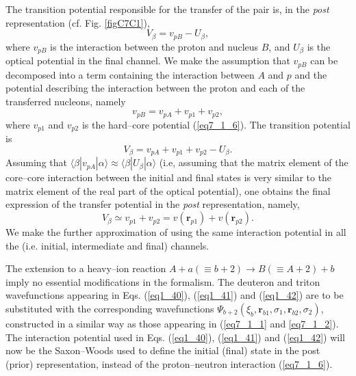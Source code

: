 The transition potential responsible for the transfer of the pair is, in the \emph{post} representation (cf. Fig. \ref{figC7C1}),
\begin{equation}\label{eq1_43}
    V_\beta=v_{pB}-U_{\beta},
\end{equation}
where $v_{pB}$ is the interaction between the proton and nucleus $B$, and $U_{\beta}$ is the optical potential in the final channel. We make the assumption that $v_{pB}$ can be decomposed into a term containing the interaction between $A$ and $p$ and the potential describing the interaction between the proton and each of the transferred nucleons, namely
\begin{equation}\label{eq1_44}
    v_{pB}=v_{pA}+v_{p1}+v_{p2},
\end{equation}
where $v_{p1}$ and $v_{p2}$ is the hard--core potential (\ref{eq7_1_6}). The transition potential is
\begin{equation}\label{eq1_45}
    V_\beta=v_{pA}+v_{p1}+v_{p2}-U_{\beta}.
\end{equation}
Assuming that $\langle \beta |v_{pA}|\alpha \rangle \approx	 \langle \beta |U_{\beta}|\alpha \rangle $ (i.e, assuming that the matrix element of the core--core interaction between the initial and final states is very similar to the matrix element of the real part of the optical potential), one obtains the final expression of the transfer potential in the \emph{post} representation, namely,	
\begin{equation}\label{eq1_45x}
    V_\beta\simeq v_{p1}+v_{p2}=v(\mathbf{r}_{p1})+v(\mathbf{r}_{p2}).
\end{equation}
We make the further approximation of using the same interaction potential in all the (i.e. initial, intermediate and final) channels.


The extension to a heavy--ion reaction $A+a(\equiv b+2) \longrightarrow B(\equiv A+2)+b$ imply no essential modifications in the formalism. The deuteron and triton wavefunctions appearing in Eqs. (\ref{eq1_40}), (\ref{eq1_41}) and (\ref{eq1_42}) are to be substituted with the corresponding wavefunctions $\Psi_{b+2}(\xi_b,\mathbf r_{b1},\sigma_1,\mathbf r_{b2},\sigma_2)$, constructed in a similar way as those appearing in (\ref{eq7_1_1} and \ref{eq7_1_2}). The interaction potential used in  Eqs. (\ref{eq1_40}), (\ref{eq1_41}) and (\ref{eq1_42})  will now be the Saxon--Woods used to define the initial (final) state in the post (prior) representation, instead of the proton--neutron interaction (\ref{eq7_1_6}).

